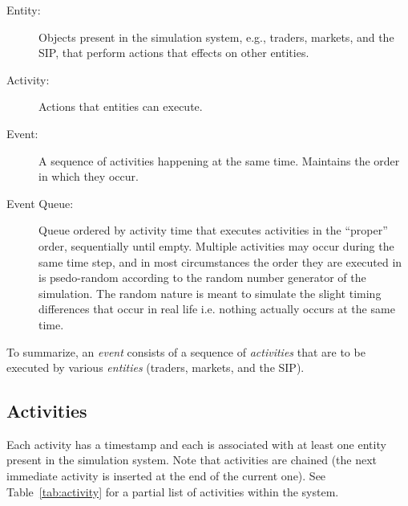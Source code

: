 \documentclass[11pt]{article}
\begin{document}
\begin{description}
\item[Entity:] Objects present in the simulation system, e.g., traders, markets,
  and the SIP, that perform actions that effects on other entities.

\item[Activity:] Actions that entities can execute.

\item[Event:] A sequence of activities happening at the same time. Maintains the
  order in which they occur.

\item[Event Queue:] Queue ordered by activity time that executes activities in
  the ``proper'' order, sequentially until empty. Multiple activities may occur
  during the same time step, and in most circumstances the order they are
  executed in is psedo-random according to the random number generator of the
  simulation. The random nature is meant to simulate the slight timing
  differences that occur in real life i.e. nothing actually occurs at the same
  time.
\end{description}

To summarize, an \emph{event} consists of a sequence of \emph{activities} that
are to be executed by various \emph{entities} (traders, markets, and the SIP).


\subsection{Activities}

Each activity has a timestamp and each is associated with at least one entity
present in the simulation system. Note that activities are chained (the next
immediate activity is inserted at the end of the current one). See
Table~\ref{tab:activity} for a partial list of activities within the system.
\end{document}
